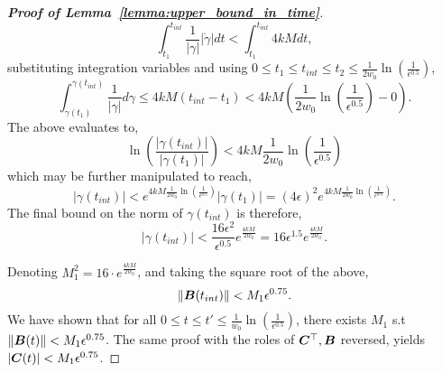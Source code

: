 \begin{proof}[\textbf{Proof of Lemma~\ref{lemma:upper_bound_in_time}}]
\begin{equation}
    \int_{t_1}^{t_{int}} \frac{1}{|\gamma|}|\dot{\gamma}| dt < \int_{t_1}^{t_{int}}4k M dt,
\end{equation}
substituting integration variables and using $0\le t_1\le t_{int}\le t_2\le \frac{1}{2w_0}\ln{\left(\frac{1}{\epsilon^{0.5}}\right)}$,
\begin{equation}
    \int_{\gamma(t_1)}^{\gamma(t_{int})} \frac{1}{|\gamma|}d\gamma \leq 4k M \left(t_{int}-t_1\right) < 4kM \left(\frac{1}{2w_0}\ln{\left(\frac{1}{\epsilon^{0.5}}\right)}-0\right).
\end{equation}
The above evaluates to,
\begin{equation}
    \ln\left( \frac{|\gamma(t_{int})|}{|\gamma(t_1)|} \right) < 4k M \frac{1}{2w_0}\ln{\left(\frac{1}{\epsilon^{0.5}}\right)}
\end{equation}
which may be further manipulated to reach,
\begin{equation}
    |\gamma(t_{int})| < e^{4k M \frac{1}{2w_0}\ln{\left(\frac{1}{\epsilon^{0.5}}\right)}} |\gamma(t_1)| = (4 \epsilon)^2 e^{4k M \frac{1}{2w_0}\ln{\left(\frac{1}{\epsilon^{0.5}}\right)}}.
\end{equation}
The final bound on the norm of $\gamma(t_{int})$ is therefore,
\begin{equation}
  |\gamma(t_{int})| <  \frac{16 \epsilon^2}{\epsilon^{0.5}} e^{\frac{4k M}{2w_0}}=16\epsilon^{1.5}e^{\frac{4k M}{2w_0}}.
\end{equation}
%

Denoting $M_1^2 = 16 \cdot e^{\frac{4k M}{2w_0}}$, and taking the square root of the above,
\begin{equation}
    \|{\bm{B}}(t_{int})\| <  M_1 \epsilon^{0.75}.
\end{equation}
%
We have shown that for all $0\le t\le t'\le\frac{1}{w_0}\ln{\left(\frac{1}{\epsilon^{0.5}}\right)}$, there exists $M_1$ s.t $\|{\bm{B}}(t)\|<M_1 \epsilon^{0.75}$. The same proof with the roles of ${\bm{C}}^\top, {\bm{B}}$ reversed, yields $|{\bm{C}}(t)|<M_1 \epsilon^{0.75}$. 


\end{proof}
